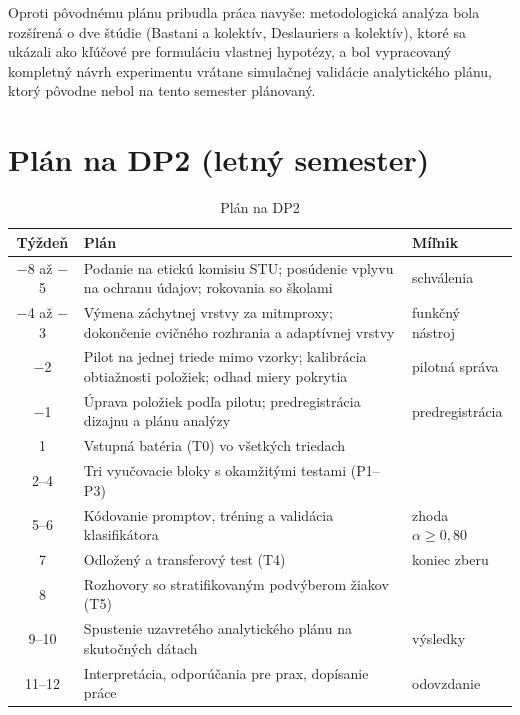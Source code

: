 Oproti pôvodnému plánu pribudla práca navyše: metodologická analýza bola rozšírená o dve štúdie (Bastani a kolektív, Deslauriers a kolektív), ktoré sa ukázali ako kľúčové pre formuláciu vlastnej hypotézy, a bol vypracovaný kompletný návrh experimentu vrátane simulačnej validácie analytického plánu, ktorý pôvodne nebol na tento semester plánovaný.

\section{Plán na DP2 (letný semester)}
\label{sec:Work-Schedule-2nd-semester}

\begin{table}[H]
    \centering
    \caption{Plán na DP2}
    \label{tab:dp2}
    \small
    \begin{tabularx}{\textwidth}{@{}c X l@{}}
    \toprule
        \textbf{Týždeň} & \textbf{Plán} & \textbf{Míľnik} \\
    \midrule
        $-$8 až $-$5 & Podanie na etickú komisiu STU; posúdenie vplyvu na ochranu údajov; rokovania so školami & schválenia \\
        $-$4 až $-$3 & Výmena záchytnej vrstvy za mitmproxy; dokončenie cvičného rozhrania a adaptívnej vrstvy & funkčný nástroj \\
        $-$2 & Pilot na jednej triede mimo vzorky; kalibrácia obtiažnosti položiek; odhad miery pokrytia & pilotná správa \\
        $-$1 & Úprava položiek podľa pilotu; predregistrácia dizajnu a plánu analýzy & predregistrácia \\
        1 & Vstupná batéria (T0) vo všetkých triedach & \\
        2--4 & Tri vyučovacie bloky s okamžitými testami (P1--P3) & \\
        5--6 & Kódovanie promptov, tréning a validácia klasifikátora & zhoda $\alpha \geq 0{,}80$ \\
        7 & Odložený a transferový test (T4) & koniec zberu \\
        8 & Rozhovory so stratifikovaným podvýberom žiakov (T5) & \\
        9--10 & Spustenie uzavretého analytického plánu na skutočných dátach & výsledky \\
        11--12 & Interpretácia, odporúčania pre prax, dopísanie práce & odovzdanie \\
    \bottomrule
    \end{tabularx}
\end{table}

